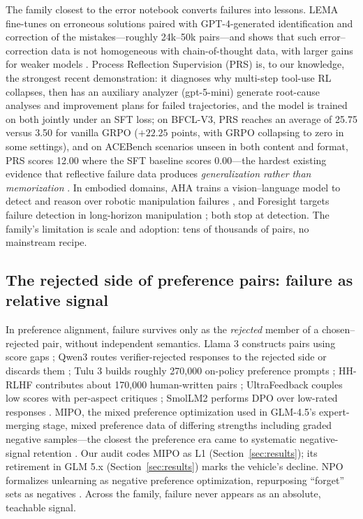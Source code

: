 \documentclass[10pt]{article}
\begin{document}
The family closest to the error notebook converts failures into lessons. LEMA fine-tunes on erroneous solutions paired with GPT-4-generated identification and correction of the mistakes---roughly 24k--50k pairs---and shows that such error--correction data is not homogeneous with chain-of-thought data, with larger gains for weaker models \cite{an2023lema}. Process Reflection Supervision (PRS) is, to our knowledge, the strongest recent demonstration: it diagnoses why multi-step tool-use RL collapses, then has an auxiliary analyzer (gpt-5-mini) generate root-cause analyses and improvement plans for failed trajectories, and the model is trained on both jointly under an SFT loss; on BFCL-V3, PRS reaches an average of 25.75 versus 3.50 for vanilla GRPO ($+22.25$ points, with GRPO collapsing to zero in some settings), and on ACEBench scenarios unseen in both content and format, PRS scores 12.00 where the SFT baseline scores 0.00---the hardest existing evidence that reflective failure data produces \emph{generalization rather than memorization} \cite{hao2026prs}. In embodied domains, AHA trains a vision--language model to detect and reason over robotic manipulation failures \cite{duan2024aha}, and Foresight targets failure detection in long-horizon manipulation \cite{zhang2026foresight}; both stop at detection. The family's limitation is scale and adoption: tens of thousands of pairs, no mainstream recipe.

\subsection{The rejected side of preference pairs: failure as relative signal}

In preference alignment, failure survives only as the \emph{rejected} member of a chosen--rejected pair, without independent semantics. Llama 3 constructs pairs using score gaps \cite{grattafiori2024llama3}; Qwen3 routes verifier-rejected responses to the rejected side or discards them \cite{qwen2025qwen3}; Tulu 3 builds roughly 270,000 on-policy preference prompts \cite{lambert2025tulu3}; HH-RLHF contributes about 170,000 human-written pairs \cite{anthropic2022hhrlhf}; UltraFeedback couples low scores with per-aspect critiques \cite{openbmb2023ultrafeedback}; SmolLM2 performs DPO over low-rated responses \cite{hftb2024smoltalk}. MIPO, the mixed preference optimization used in GLM-4.5's expert-merging stage, mixed preference data of differing strengths including graded negative samples---the closest the preference era came to systematic negative-signal retention \cite{zai2025glm45}. Our audit codes MIPO as L1 (Section~\ref{sec:results}); its retirement in GLM 5.x (Section~\ref{sec:results}) marks the vehicle's decline. NPO formalizes unlearning as negative preference optimization, repurposing ``forget'' sets as negatives \cite{zhang2024npo}. Across the family, failure never appears as an absolute, teachable signal.
\end{document}
